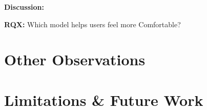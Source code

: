 \documentclass{sig-alternate-05-2015}
\begin{document}












\textbf{Discussion:}

%	




\textbf{RQX:} Which model helps users feel more Comfortable?

















%

\section{Other Observations}
\label{sec:miss}






\section{Limitations \& Future Work}
\label{sec:futurework}

\end{document}

